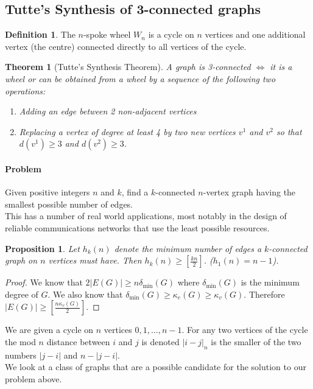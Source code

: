 \documentclass{article}
\newtheorem*{thm}{Theorem}
\newtheorem*{prop}{Proposition}
\theoremstyle{definition}
\newtheorem*{defn}{Definition}
\begin{document}
\subsection{Tutte's Synthesis of 3-connected graphs}
\begin{defn}
The $n$-spoke wheel $W_n$ is a cycle on $n$ vertices and one additional vertex (the centre) connected directly to all vertices of the cycle.
\end{defn}

\begin{thm}[Tutte's Synthesis Theorem]
A graph is 3-connected $\iff$ it is a wheel or can be obtained from a wheel by a sequence of the following two operations:
\begin{enumerate}
\item Adding an edge between 2 non-adjacent vertices
\item Replacing a vertex of degree at least 4 by two new vertices $v^1$ and $v^2$ so that $d(v^1) \ge 3$ and $d(v^2)\ge 3$.
\end{enumerate}
\end{thm}

\paragraph{Problem} Given positive integers $n$ and $k$, find a $k$-connected $n$-vertex graph having the smallest possible number of edges. \\
This has a number of real world applications, most notably in the design of reliable communications networks that use the least possible resources.


\begin{prop}
Let $h_k(n)$ denote the minimum number of edges a $k$-connected graph on $n$ vertices must have.
Then $h_k(n) \ge \left[\frac{kn}{2}\right]$. 
($h_1(n) = n-1$).
\end{prop}

\begin{proof}
We know that $2|E(G)| \ge  n\delta_{\text{min}}(G)$ where $\delta_{\text{min}}(G)$ is the minimum degree of $G$.
We also know that $\delta_{\text{min}}(G) \ge \kappa_e(G) \ge \kappa_v(G)$.
Therefore $|E(G)| \ge \left[\frac{n\kappa_v(G)}{2}\right]$.
\end{proof}

We are given a cycle on $n$ vertices $0,1,\ldots,n-1$.
For any two vertices of the cycle the mod $n$ distance between $i$ and $j$ is denoted $|i-j|_n$ is the smaller of the two numbers $|j-i|$ and $n-|j-i|$. \\
We look at a class of graphs that are a possible candidate for the solution to our problem above.
\end{document}
